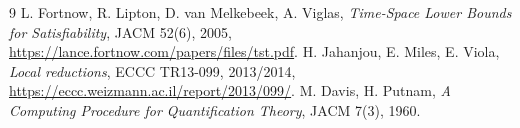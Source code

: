 \documentclass[11pt]{article}
\begin{document}
\begin{thebibliography}{9}
 L. Fortnow, R. Lipton, D. van Melkebeek, A. Viglas, \emph{Time-Space Lower Bounds for Satisfiability}, JACM 52(6), 2005, \url{https://lance.fortnow.com/papers/files/tst.pdf}.
 H. Jahanjou, E. Miles, E. Viola, \emph{Local reductions}, ECCC TR13-099, 2013/2014, \url{https://eccc.weizmann.ac.il/report/2013/099/}.
 M. Davis, H. Putnam, \emph{A Computing Procedure for Quantification Theory}, JACM 7(3), 1960.
\end{thebibliography}
\end{document}
